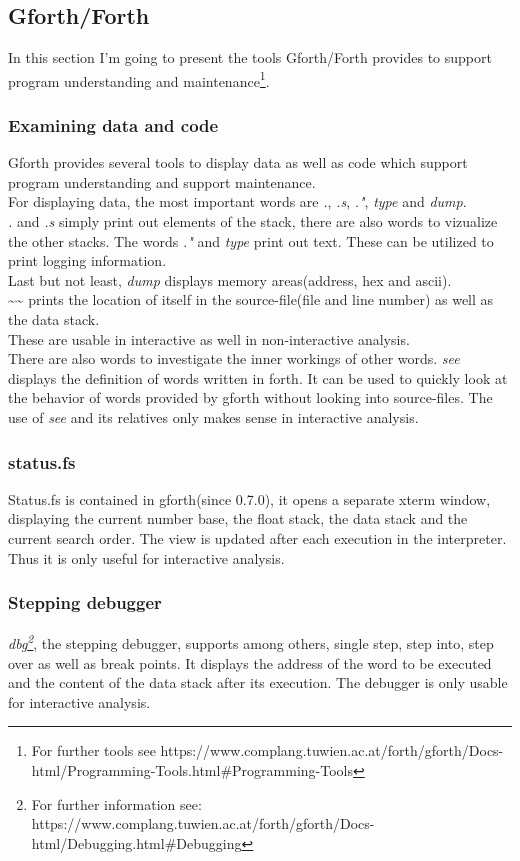 \subsection{Gforth/Forth}

In this section I'm going to present the tools Gforth/Forth provides to support program understanding and maintenance\footnote{For further tools see https://www.complang.tuwien.ac.at/forth/gforth/Docs-html/Programming-Tools.html\#Programming-Tools}.

\subsubsection*{Examining data and code}
Gforth provides several tools to display data as well as code which support program understanding and support maintenance.\\
For displaying data, the most important words are \emph{.}, \emph{.s}, \emph{."}, \emph{type} and \emph{dump}.\\
\emph{.} and \emph{.s} simply print out elements of the stack, there are also words to vizualize the other stacks.
The words \emph{."} and \emph{type} print out text. These can be utilized to print logging information.\\
Last but not least, \emph{dump} displays memory areas(address, hex and ascii).\\
\textasciitilde\textasciitilde\: prints the location of itself in the source-file(file and line number) as well as the data stack.\\
These are usable in interactive as well in non-interactive analysis.\\
There are also words to investigate the inner workings of other words. 
\emph{see} displays the definition of words written in forth. It can be used to quickly look at the behavior of words provided by gforth without looking into source-files. The use of \emph{see} and its relatives only makes sense in interactive analysis.

\subsubsection*{status.fs}
Status.fs is contained in gforth(since 0.7.0), it opens a separate xterm window, displaying the current number base, the float stack, the data stack and the current search order. The view is updated after each execution in the interpreter. Thus it is only useful for interactive analysis.

\subsubsection*{Stepping debugger}
\emph{dbg\footnote{For further information see: https://www.complang.tuwien.ac.at/forth/gforth/Docs-html/Debugging.html\#Debugging}}, the stepping debugger, supports among others, single step, step into, step over as well as break points. It displays the address of the word to be executed and the content of the data stack after its execution. The debugger is only usable for interactive analysis.

